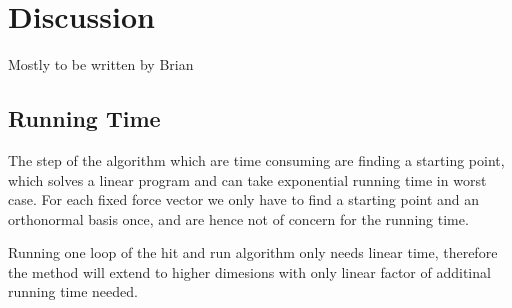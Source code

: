 \section{Discussion}
Mostly to be written by Brian
\subsection{Running Time}
The step of the algorithm which are time consuming are finding a starting point, which solves a linear program and can take exponential running time in worst case. For each fixed force vector we only have to find a starting point and an orthonormal basis once, and are hence not of concern for the running time.

Running one loop of the hit and run algorithm only needs linear time, therefore the method will extend to higher dimesions with only linear factor of additinal running time needed.